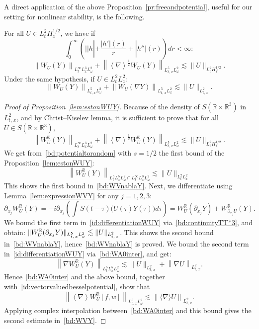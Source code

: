 \documentclass[10pt]{amsart}
\theoremstyle{definition}\newtheorem{defi}[theo]{Definition}\newtheorem{rema}[theo]{Remark}\newtheorem{exam}[theo]{Example}\newtheorem{exem}[theo]{Example}\newtheorem{nota}[theo]{Notation}
\newcommand{\R}{\mathbb{R}}
\begin{document}
A direct application of the above Proposition~\ref{pr:freeandpotential}, useful for our setting for nonlinear stability, is the following.


\begin{prop}\label{lem:estonWUY}
For all $U\in L^2_{t}H^{1/2}_x$, we have if
\[
\int_0^\infty \left(||h|+\frac{|h'|(r)}{r}+|h''|(r)\right)dr<\infty:
\]
\begin{equation} \label{bd:WVY}
\left\|W_U(Y)\right\|_{L^{\infty}_tL^3_xL^2_\omega} +\left\| \left\langle \nabla \right\rangle^{\frac 12} W_U(Y)\right\|_{L^5_{t,\,x}L^2_\omega}\lesssim \|U\|_{L^2_{t}H^{1/2}_x}.
\end{equation}
Under the same hypothesis, if $U\in L^2_{t}L^2_x$:
\begin{equation} \label{bd:WVnablaY}
\left\|W_U(Y)\right\|_{L^5_{t,\,x}L^2_\omega}+\left\|W_U(\nabla Y)\right\|_{L^5_{t,\,x}L^2_\omega}\lesssim \|U\|_{L^2_{t,\,x}}.
\end{equation}
\end{prop}


\begin{proof}[Proof of Proposition~\ref{lem:estonWUY}]
Because of the density of $S(\R\times \R^3)$ in $L^2_{t,\,x}$, and by Christ--Kiselev lemma, it is sufficient to prove that for all $U \in S(\R\times \R^3)$,
\[
\left\| W_{U}^{\R}(Y)\right\|_{L^{\infty}_tL^3_xL^2_\omega}+\left\|\left\langle \nabla \right\rangle^{\frac 12} W_{U}^{\R}(Y)\right\|_{L^5_{t,\,x} L^2_\omega} \lesssim \|U\|_{L^2_{t}H^{1/2}_x}.
\]
We get from~\eqref{bd:potentialtorandom} with $s=1/2$ the first bound of the Proposition~\ref{lem:estonWUY}:
\begin{equation} \label{bd:WA0inter}
\left\|W^{\R}_U(Y)\right\|_{L^5_tL^5_xL^2_\omega\cap L^{\infty}_tL^3_xL^2_\omega}\lesssim \| U\|_{L^2_tL^2_x}
\end{equation}
This shows the first bound in~\eqref{bd:WVnablaY}. Next, we differentiate using Lemma~\ref{lem:expressionWVY} for any $j=1,2,3$:
\begin{equation} \label{id:differentiationWUY}
\partial_{x_j} W^{\R}_U(Y)= -i\partial_{x_j}\left(\int S(t-\tau)\big(U(\tau)Y(\tau)\big)d\tau\right)=W^{\R}_{U}\left(\partial_{x_j}Y\right)+W^{\R}_{\partial_{x_j}U}(Y).
\end{equation}
We bound the first term in~\eqref{id:differentiationWUY} via~\eqref{bd:continuityTT*3}, and obtain: $\| W^{\R}_U(\partial_{x_j}Y)\|_{L^5_{t,\,x}L^2_\omega}\linebreak\lesssim \| U \|_{L^2_{t,\,x}}$. This shows the second bound in~\eqref{bd:WVnablaY}, hence~\eqref{bd:WVnablaY} is proved. We bound the second term in~\eqref{id:differentiationWUY} via~\eqref{bd:WA0inter}, and get:
\[
\left\| \nabla W^{\R}_U(Y)\right\|_{L^5_tL^5_xL^2_\omega}\lesssim \| U\|_{L^2_{t,\,x}}+ \left\| \nabla U\right\|_{L^2_{t,\,x}}.
\]
Hence~\eqref{bd:WA0inter} and the above bound, together with~\eqref{id:vectorvaluedbesselpotential}, show that
\[
\left\| \left\langle \nabla \right\rangle W^{\R}_U\left[f,w\right]\right\|_{L^5_{t,\,x}L^2_\omega}\lesssim \left\| \langle \nabla \rangle U\right\|_{L^2_{t,\,x}}.
\]
Applying complex interpolation between~\eqref{bd:WA0inter} and this bound gives the second estimate in~\eqref{bd:WVY}.
\end{proof}
\end{document}
